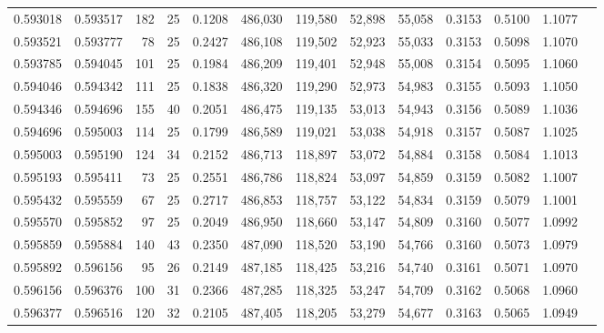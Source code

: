 \begin{tabular}{rrrrrrrrrrrrr}
0.593018 & 0.593517 &   182 &  25 &                                     0.1208 & 486,030 & 119,580 &  52,898 &  55,058 & 0.3153 & 0.5100 & 1.1077 \\
0.593521 & 0.593777 &    78 &  25 &                                     0.2427 & 486,108 & 119,502 &  52,923 &  55,033 & 0.3153 & 0.5098 & 1.1070 \\
0.593785 & 0.594045 &   101 &  25 &                                     0.1984 & 486,209 & 119,401 &  52,948 &  55,008 & 0.3154 & 0.5095 & 1.1060 \\
0.594046 & 0.594342 &   111 &  25 &                                     0.1838 & 486,320 & 119,290 &  52,973 &  54,983 & 0.3155 & 0.5093 & 1.1050 \\
0.594346 & 0.594696 &   155 &  40 &                                     0.2051 & 486,475 & 119,135 &  53,013 &  54,943 & 0.3156 & 0.5089 & 1.1036 \\
0.594696 & 0.595003 &   114 &  25 &                                     0.1799 & 486,589 & 119,021 &  53,038 &  54,918 & 0.3157 & 0.5087 & 1.1025 \\
0.595003 & 0.595190 &   124 &  34 &                                     0.2152 & 486,713 & 118,897 &  53,072 &  54,884 & 0.3158 & 0.5084 & 1.1013 \\
0.595193 & 0.595411 &    73 &  25 &                                     0.2551 & 486,786 & 118,824 &  53,097 &  54,859 & 0.3159 & 0.5082 & 1.1007 \\
0.595432 & 0.595559 &    67 &  25 &                                     0.2717 & 486,853 & 118,757 &  53,122 &  54,834 & 0.3159 & 0.5079 & 1.1001 \\
0.595570 & 0.595852 &    97 &  25 &                                     0.2049 & 486,950 & 118,660 &  53,147 &  54,809 & 0.3160 & 0.5077 & 1.0992 \\
0.595859 & 0.595884 &   140 &  43 &                                     0.2350 & 487,090 & 118,520 &  53,190 &  54,766 & 0.3160 & 0.5073 & 1.0979 \\
0.595892 & 0.596156 &    95 &  26 &                                     0.2149 & 487,185 & 118,425 &  53,216 &  54,740 & 0.3161 & 0.5071 & 1.0970 \\
0.596156 & 0.596376 &   100 &  31 &                                     0.2366 & 487,285 & 118,325 &  53,247 &  54,709 & 0.3162 & 0.5068 & 1.0960 \\
0.596377 & 0.596516 &   120 &  32 &                                     0.2105 & 487,405 & 118,205 &  53,279 &  54,677 & 0.3163 & 0.5065 & 1.0949 \\

\end{tabular}
